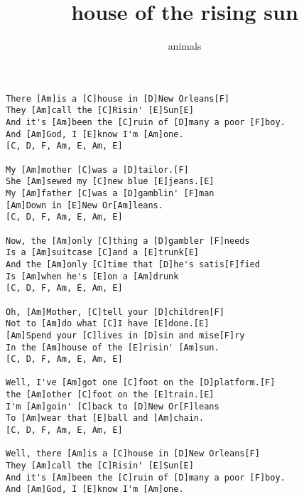 \author{animals}
\title{house of the rising sun}
\maketitle
\begin{verbatim}
There [Am]is a [C]house in [D]New Orleans[F]
They [Am]call the [C]Risin' [E]Sun[E]
And it's [Am]been the [C]ruin of [D]many a poor [F]boy.
And [Am]God, I [E]know I'm [Am]one.
[C, D, F, Am, E, Am, E]

My [Am]mother [C]was a [D]tailor.[F]
She [Am]sewed my [C]new blue [E]jeans.[E]
My [Am]father [C]was a [D]gamblin' [F]man
[Am]Down in [E]New Or[Am]leans.
[C, D, F, Am, E, Am, E]

Now, the [Am]only [C]thing a [D]gambler [F]needs
Is a [Am]suitcase [C]and a [E]trunk[E]
And the [Am]only [C]time that [D]he's satis[F]fied
Is [Am]when he's [E]on a [Am]drunk
[C, D, F, Am, E, Am, E]

Oh, [Am]Mother, [C]tell your [D]children[F]
Not to [Am]do what [C]I have [E]done.[E]
[Am]Spend your [C]lives in [D]sin and mise[F]ry
In the [Am]house of the [E]risin' [Am]sun.
[C, D, F, Am, E, Am, E]

Well, I've [Am]got one [C]foot on the [D]platform.[F]
the [Am]other [C]foot on the [E]train.[E]
I'm [Am]goin' [C]back to [D]New Or[F]leans
To [Am]wear that [E]ball and [Am]chain.
[C, D, F, Am, E, Am, E]

Well, there [Am]is a [C]house in [D]New Orleans[F]
They [Am]call the [C]Risin' [E]Sun[E]
And it's [Am]been the [C]ruin of [D]many a poor [F]boy.
And [Am]God, I [E]know I'm [Am]one.
\end{verbatim}